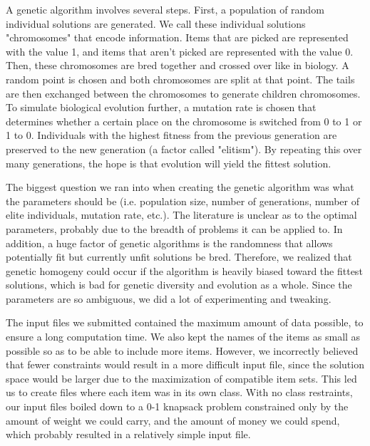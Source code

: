 \documentclass[11pt]{article}
\begin{document}
\vspace{4pt}

A genetic algorithm involves several steps. First, a population of random individual solutions are generated. We call these individual solutions "chromosomes" that encode information. Items that are picked are represented with the value 1, and items that aren't picked are represented with the value 0. Then, these chromosomes are bred together and crossed over like in biology. A random point is chosen and both chromosomes are split at that point. The tails are then exchanged between the chromosomes to generate children chromosomes. To simulate biological evolution further, a mutation rate is chosen that determines whether a certain place on the chromosome is switched from 0 to 1 or 1 to 0. Individuals with the highest fitness from the previous generation are preserved to the new generation (a factor called "elitism"). By repeating this over many generations, the hope is that evolution will yield the fittest solution.

\vspace{4pt}

The biggest question we ran into when creating the genetic algorithm was what the parameters should be (i.e. population size, number of generations, number of elite individuals, mutation rate, etc.). The literature is unclear as to the optimal parameters, probably due to the breadth of problems it can be applied to. In addition, a huge factor of genetic algorithms is the randomness that allows potentially fit but currently unfit solutions be bred. Therefore, we realized that genetic homogeny could occur if the algorithm is heavily biased toward the fittest solutions, which is bad for genetic diversity and evolution as a whole. Since the parameters are so ambiguous, we did a lot of experimenting and tweaking. 

\vspace{4pt}
The input files we submitted contained the maximum amount of data possible, to ensure a long computation time.  We also kept the names of the items as small as possible so as to be able to include more items.  However, we incorrectly believed that fewer constraints would result in a more difficult input file, since the solution space would be larger due to the maximization of compatible item sets.  This led us to create files where each item was in its own class.  With no class restraints, our input files boiled down to a 0-1 knapsack problem constrained only by the amount of weight we could carry, and the amount of money we could spend, which probably resulted in a relatively simple input file.
\end{document}

